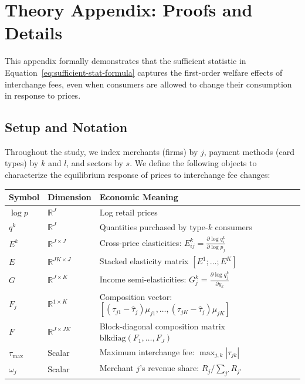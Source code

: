 \documentclass[11pt,english]{article}
\theoremstyle{remark}
\renewcommand\thesubsection{\Roman{section}.\Alph{subsection}}
\renewcommand\thesubsubsection{\Roman{section}.\Alph{subsection}.\arabic{subsubsection}}
\begin{document}
 
\appendix
\renewcommand{\thesubsection}{\Alph{section}.\arabic{subsection}}
\renewcommand{\thesubsubsection}{\Alph{section}.\arabic{subsection}.\arabic{subsubsection}}

\renewcommand{\thepage}{A-\arabic{page}}
\renewcommand{\thetable}{A.\arabic{table}}
\renewcommand{\thefigure}{A.\arabic{figure}}
\setcounter{table}{0}  \setcounter{figure}{0}  

\clearpage{}


\section{Theory Appendix: Proofs and Details}\label{sec:appendix-theory}

This appendix formally demonstrates that the sufficient statistic in Equation~\ref{eq:sufficient-stat-formula} captures the first-order welfare effects of interchange fees, even when consumers are allowed to change their consumption in response to prices.

\subsection{Setup and Notation}\label{subsec:setup-notation}

Throughout the study, we index merchants (firms) by $j$, payment methods (card types) by $k$ and $l$, and sectors by $s$.
We define the following objects to characterize the equilibrium response of prices to interchange fee changes:

\begin{center}
\begin{tabular}{lll}
\toprule
\textbf{Symbol} & \textbf{Dimension} & \textbf{Economic Meaning} \\
\midrule
$\log p$ & $\mathbb{R}^J$ & Log retail prices \\
$q^k$ & $\mathbb{R}^J$ & Quantities purchased by type-$k$ consumers \\
$E^k$ & $\mathbb{R}^{J \times J}$ & Cross-price elasticities: $E^k_{ij} = \frac{\partial \log q_i^k}{\partial \log p_j}$ \\
$E$ & $\mathbb{R}^{JK \times J}$ & Stacked elasticity matrix $[E^1; \ldots; E^K]$ \\
$G$ & $\mathbb{R}^{J \times K}$ & Income semi-elasticities: $G^k_j = \frac{\partial \log q_j^k}{\partial y_k}$ \\
$F_j$ & $\mathbb{R}^{1 \times K}$ & Composition vector: $[(\tau_{j1} - \hat{\tau}_j)\mu_{j1}, \ldots, (\tau_{jK} - \hat{\tau}_j)\mu_{jK}]$ \\
$F$ & $\mathbb{R}^{J \times JK}$ & Block-diagonal composition matrix $\mathrm{blkdiag}(F_1, \ldots, F_J)$ \\
$\tau_{\max}$ & Scalar & Maximum interchange fee: $\max_{j,k} |\tau_{jk}|$ \\
$\omega_j$ & Scalar & Merchant $j$'s revenue share: $R_j / \sum_{j'} R_{j'}$ \\
\bottomrule
\end{tabular}
\end{center}
\end{document}
